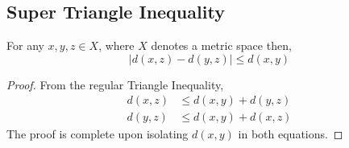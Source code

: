 \documentclass[../../main.tex]{subfiles}
\begin{document}
\subsection{Super Triangle Inequality}
\begin{lemma}\label{lemma:triangle inequality advanced}
    For any $x,y,z\in X$, where $X$ denotes a metric space then,
    \[
    \biggl|d(x,z)-d(y,z)\biggr|\leq d(x,y)
    \]
\end{lemma}
\begin{proof}
    From the regular Triangle Inequality,
    \begin{align*}
        d(x,z)&\leq d(x,y) + d(y,z)\\
        d(y,z)&\leq d(x,y) + d(x,z)
    \end{align*}
    The proof is complete upon isolating $d(x,y)$ in both equations.
\end{proof}
\end{document}
